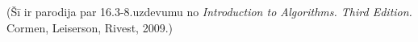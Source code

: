 \documentclass[a4paper]{article}
\begin{document}
(Šī ir parodija par 16.3-8.uzdevumu no {\em Introduction to Algorithms. Third Edition.} Cormen, Leiserson, Rivest, 2009.)











\end{document}
